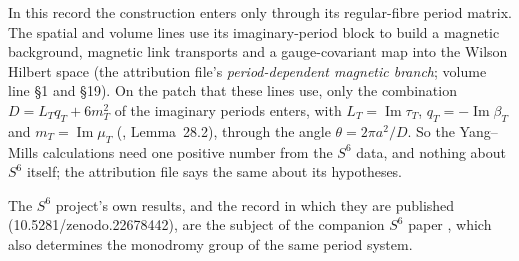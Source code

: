 In this record the construction enters only through its regular-fibre period matrix. The spatial and volume lines use its imaginary-period block to build a magnetic background, magnetic link transports and a gauge-covariant map into the Wilson Hilbert space (the attribution file's \emph{period-dependent magnetic branch}; volume line §1 and §19). On the patch that these lines use, only the combination $D=L_Tq_T+6m_T^2$ of the imaginary periods enters, with $L_T=\operatorname{Im}\tau_T$, $q_T=-\operatorname{Im}\beta_T$ and $m_T=\operatorname{Im}\mu_T$ (, Lemma~28.2), through the angle $\theta=2\pi a^2/D$. So the Yang--Mills calculations need one positive number from the $S^6$ data, and nothing about $S^6$ itself; the attribution file says the same about its hypotheses.

The $S^6$ project's own results, and the record in which they are published (10.5281/zenodo.22678442), are the subject of the companion $S^6$ paper \cite{SixSpherePaper}, which also determines the monodromy group of the same period system.
